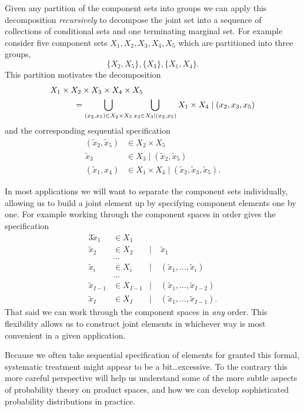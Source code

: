 \documentclass[
  letterpaper,
  DIV=11,
  numbers=noendperiod]{scrartcl}
\begin{document}
Given any partition of the component sets into groups we can apply this
decomposition \emph{recursively} to decompose the joint set into a
sequence of collections of conditional sets and one terminating marginal
set. For example consider five component sets
\(X_{1}, X_{2}, X_{3}, X_{4}, X_{5}\) which are partitioned into three
groups, \[
\{ X_{2}, X_{5} \}, \{ X_{3} \}, \{X_{1}, X_{4} \}.
\] This partition motivates the decomposition \begin{align*}
&X_{1} \times X_{2} \times X_{3} \times X_{4} \times X_{5}
\\
&\hspace{10mm} =
\bigcup_{ (x_{2}, x_{5}) \in X_{2} \times X_{5} }
\bigcup_{ x_{3} \in X_{3} \mid (x_{2}, x_{5}) }
X_{1} \times X_{4} \mid (x_{2}, x_{3}, x_{5})
\end{align*} and the corresponding sequential specification
\begin{align*}
(\tilde{x}_{2}, \tilde{x}_{5}) &\in
X_{2} \times X_{5}
\\
\tilde{x}_{3} &\in
X_{3} \mid (\tilde{x}_{2}, \tilde{x}_{5})
\\
(\tilde{x}_{1}, x_{4}) &\in
X_{1} \times X_{4} \mid (\tilde{x}_{2}, \tilde{x}_{3}, \tilde{x}_{5}).
\end{align*}

In most applications we will want to separate the component sets
individually, allowing us to build a joint element up by specifying
component elements one by one. For example working through the component
spaces in order gives the specification \begin{alignat*}{3}
\tilde{x}_{1} &\in  X_{1} &&
\\
\tilde{x}_{2} &\in X_{2} &\mid& \; \tilde{x}_{1}
\\
&\ldots
\\
\tilde{x}_{i} &\in X_{i} &\mid& \; ( \tilde{x}_{1}, \ldots, \tilde{x}_{i} )
\\
&\ldots
\\
\tilde{x}_{I - 1} &\in X_{I - 1} &\mid& \; ( \tilde{x}_{1}, \ldots, \tilde{x}_{I - 2} )
\\
\tilde{x}_{I} &\in X_{I} &\mid& \; ( \tilde{x}_{1}, \ldots, \tilde{x}_{I - 1} ).
\end{alignat*} That said we can work through the component spaces in
\emph{any} order. This flexibility allows us to construct joint elements
in whichever way is most convenient in a given application.

Because we often take sequential specification of elements for granted
this formal, systematic treatment might appear to be a
bit\ldots excessive. To the contrary this more careful perspective will
help us understand some of the more subtle aspects of probability theory
on product spaces, and how we can develop sophisticated probability
distributions in practice.
\end{document}
